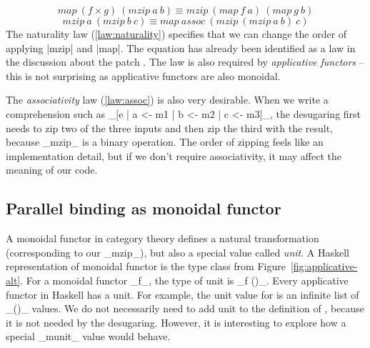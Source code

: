 \documentclass{tmr}
\newcommand{\authornote}[3]{}
\newcommand\bay[1]{\authornote{brent}{blue}{#1}}
\newcommand\tp[1]{\authornote{tomas}{red}{#1}}
\newcommand{\assoc}{\mathit{assoc}}
\newcommand{\map}[2]{\mathit{map}\ #1\ #2}
\newcommand{\mzip}[2]{\mathit{mzip}\ #1\ #2}
\begin{document}
\begin{equation}
  \map {(f \times g)} {(\mzip a b)} \equiv \mzip {(\map f a)} {(\map g b)}
  \label{law:naturality}
\end{equation}
\begin{equation}
  \mzip a {(\mzip b c)} \equiv \map \assoc {(\mzip {(\mzip a b)} c)}
  \label{law:assoc}
\end{equation}
The naturality law (\ref{law:naturality}) specifies that we can change the order of applying 
|mzip| and |map|. The equation has already been identified as a law in the discussion about the
patch \cite{bringbackmc}. The law is also required by \textit{applicative functors} 
\cite{applicative} -- this is not surprising as applicative functors
are also monoidal.

\UndefineShortVerb{\|}
\DefineShortVerb{\_}

The \textit{associativity} law (\ref{law:assoc}) is also very desirable. When we write a 
comprehension such as _[e | a <- m1 | b <- m2 | c <- m3]_, the desugaring first needs to zip two
of the three inputs and then zip the third with the result, because _mzip_ is a binary operation. The order
of zipping feels like an implementation detail, but if we don't require associativity, it may 
affect the meaning of our code.


\subsection{Parallel binding as monoidal functor}

\bay{The following paragraph is quite confusing. Are you proposing
  some law(s)?  Or is it just a general discussion?  You need to make
  the idea of 'unit' much more concrete, perhaps showing how it can be implemented
  in terms of the existing Applicative methods.}
\tp{Turned into a separate section with some introduction that clarifies the discussion.}

A monoidal functor in category theory defines a natural transformation (corresponding to our _mzip_),
but also a special value called \textit{unit}. A Haskell representation of monoidal functor is the 
 type class from Figure~\ref{fig:applicative-alt}. For a monoidal functor _f_, the
type of unit is _f ()_. Every applicative functor in Haskell has a unit.
For example, the unit value for  is an infinite list of
_()_ values. We do not necessarily need to add unit to the definition of 
, because it is not needed by the desugaring. However, it is interesting to explore
how a special _munit_ value would behave.
\end{document}
